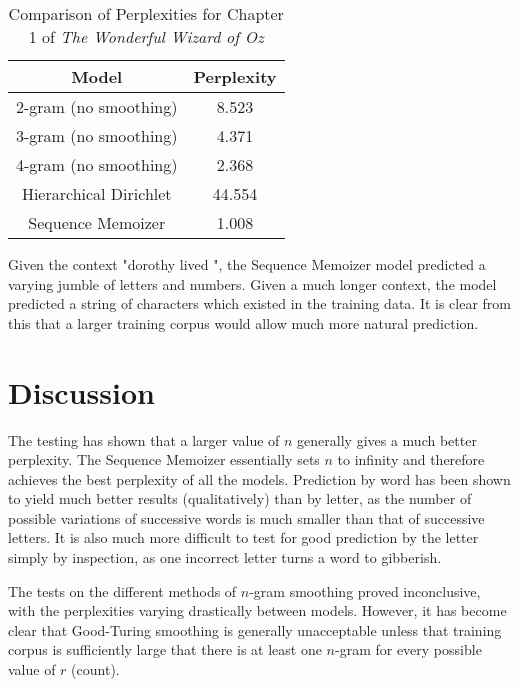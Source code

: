 \begin{table}
\caption{Comparison of Perplexities for Chapter 1 of \textit{The Wonderful Wizard of Oz}}
\label{table:chapterOnePerplexities}
\begin{center}
\begin{tabular}{|c|c|}
\hline
\textbf{Model} & \textbf{Perplexity} \\ \hline
2-gram (no smoothing) & 8.523 \\ \hline
3-gram (no smoothing) & 4.371 \\ \hline
4-gram (no smoothing) & 2.368 \\ \hline
Hierarchical Dirichlet & 44.554 \\ \hline
Sequence Memoizer & 1.008 \\ \hline
\end{tabular} 
\end{center} 
\end{table}

Given the context "dorothy lived ", the Sequence Memoizer model predicted a varying jumble of letters and numbers. Given a much longer context, the model predicted a string of characters which existed in the training data. It is clear from this that a larger training corpus would allow much more natural prediction.  

\section{Discussion}

The testing has shown that a larger value of $n$ generally gives a much better perplexity. The Sequence Memoizer essentially sets $n$ to infinity and therefore achieves the best perplexity of all the models. Prediction by word has been shown to yield much better results (qualitatively) than by letter, as the number of possible variations of successive words is much smaller than that of successive letters. It is also much more difficult to test for good prediction by the letter simply by inspection, as one incorrect letter turns a word to gibberish. 

The tests on the different methods of $n$-gram smoothing proved inconclusive, with the perplexities varying drastically between models. However, it has become clear that Good-Turing smoothing is generally unacceptable unless that training corpus is sufficiently large that there is at least one $n$-gram for every possible value of $r$ (count).


